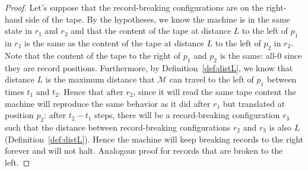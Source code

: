 \begin{proof}
  Let's suppose that the record-breaking configurations are on the right-hand side of the tape. By the hypotheses, we know the machine is in the same state in $r_1$ and $r_2$ and that the content of the tape at distance $L$ to the left of $p_1$ in $r_1$ is the same as the content of the tape at distance $L$ to the left of $p_2$ in $r_2$. Note that the content of the tape to the right of $p_1$ and $p_2$ is the same: all-0 since they are record positions. Furthermore, by Definition~\ref{def:distL}, we know that distance $L$ is the maximum distance that $\mathcal{M}$ can travel to the left of $p_1$ between times $t_1$ and $t_2$. Hence that after $r_2$, since it will read the same tape content the machine will reproduce the same behavior as it did after $r_1$ but translated at position $p_2$: after $t_2 - t_1$ steps, there will be a record-breaking configuration $r_3$ such that the distance between record-breaking configurations $r_2$ and $r_3$ is also $L$ (Definition~\ref{def:distL}). Hence the machine will keep breaking records to the right forever and will not halt. Analogous proof for records that are broken to the left.
\end{proof}


